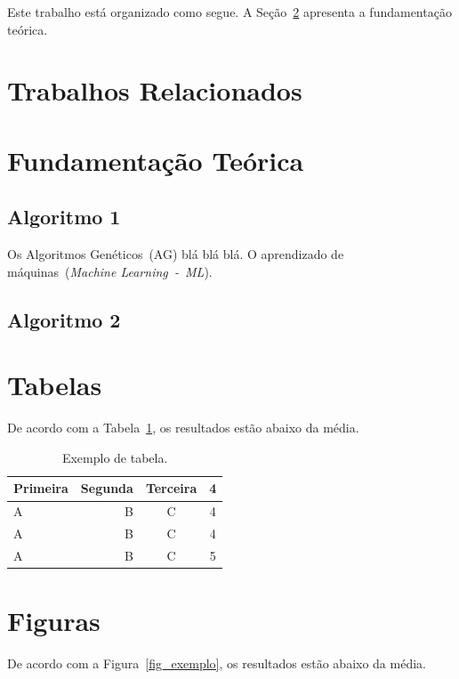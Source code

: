 \documentclass[11pt,twocolumn]{article}
\begin{document}
Este trabalho está organizado como segue. A Seção~\ref{sec_fundamentacao} apresenta a fundamentação teórica.

\section{Trabalhos Relacionados}
\label{sec_trabalhos}


\section{Fundamentação Teórica}
\label{sec_fundamentacao}


\subsection{Algoritmo 1}
\label{sec_alg1}

Os Algoritmos Genéticos~(AG) blá blá blá. O aprendizado de máquinas~(\textit{Machine Learning~-~ML}).


\subsection{Algoritmo 2}
\label{sec_alg2}


\section{Tabelas}

De acordo com a Tabela~\ref{tab_exemplo}, os resultados estão abaixo da média.

\begin{table}[h]
  \centering
  \begin{tabular}{l||r|c|c}
    \textbf{Primeira}  & \textbf{Segunda}  & \textbf{Terceira} & \textbf{4} \\
    \hline\hline
    A & B & C & 4\\ \hline
    A & B & C & 4\\ \hline
    A & B & C & 5\\ \hline
  \end{tabular}
 \caption{Exemplo de tabela.}
 \label{tab_exemplo}

\end{table}

\section{Figuras}

De acordo com a Figura~\ref{fig_exemplo}, os resultados estão abaixo da média. 
\end{document}
